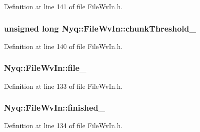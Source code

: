 Definition at line 141 of file File\+Wv\+In.\+h.

\subsubsection[{\texorpdfstring{chunk\+Threshold\+\_\+}{chunkThreshold_}}]{\setlength{\rightskip}{0pt plus 5cm}unsigned long Nyq\+::\+File\+Wv\+In\+::chunk\+Threshold\+\_\+\hspace{0.3cm}{\ttfamily [protected]}}\hypertarget{class_nyq_1_1_file_wv_in_a7f31a969df60ffba59dc789a6e8aed97}{}\label{class_nyq_1_1_file_wv_in_a7f31a969df60ffba59dc789a6e8aed97}


Definition at line 140 of file File\+Wv\+In.\+h.

\subsubsection[{\texorpdfstring{file\+\_\+}{file_}}]{ Nyq\+::\+File\+Wv\+In\+::file\+\_\+\hspace{0.3cm}{\ttfamily [protected]}}\hypertarget{class_nyq_1_1_file_wv_in_aca8d20b15a2debb70937d7ba56ea78a5}{}\label{class_nyq_1_1_file_wv_in_aca8d20b15a2debb70937d7ba56ea78a5}


Definition at line 133 of file File\+Wv\+In.\+h.

\subsubsection[{\texorpdfstring{finished\+\_\+}{finished_}}]{ Nyq\+::\+File\+Wv\+In\+::finished\+\_\+\hspace{0.3cm}{\ttfamily [protected]}}\hypertarget{class_nyq_1_1_file_wv_in_a3aa42220d4f55109b2b776fe1a290490}{}\label{class_nyq_1_1_file_wv_in_a3aa42220d4f55109b2b776fe1a290490}


Definition at line 134 of file File\+Wv\+In.\+h.

